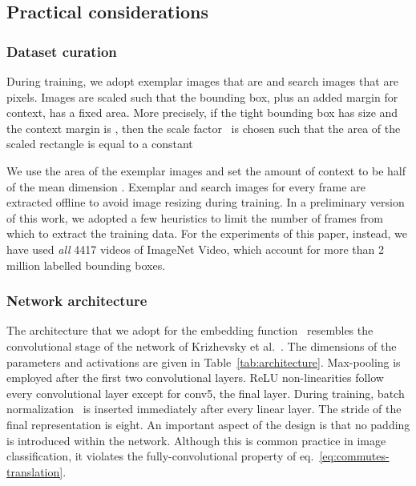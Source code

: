 \documentclass[runningheads]{llncs}
\begin{document}
\subsection{Practical considerations}
\label{sec:considerations}



\subsubsection{Dataset curation}
During training, we adopt exemplar images that are  and search images that are  pixels.
Images are scaled such that the bounding box, plus an added margin for context, has a fixed area.
More precisely, if the tight bounding box has size  and the context margin is , then the scale factor~ is chosen such that the area of the scaled rectangle is equal to a constant

We use the area of the exemplar images  and set the amount of context to be half of the mean dimension .
Exemplar and search images for every frame are extracted offline to avoid image resizing during training.
In a preliminary version of this work, we adopted a few heuristics to limit the number of frames from which to extract the training data.
For the experiments of this paper, instead, we have used \emph{all} 4417 videos of ImageNet Video, which account for more than 2 million labelled bounding boxes.

\subsubsection{Network architecture}
The architecture that we adopt for the embedding function~ resembles the convolutional stage of the network of Krizhevsky et al.~\cite{krizhevsky2012imagenet}.
The dimensions of the parameters and activations are given in Table~\ref{tab:architecture}.
Max-pooling is employed after the first two convolutional layers.
ReLU non-linearities follow every convolutional layer except for conv5, the final layer.
During training, batch normalization~\cite{ioffe2015batch} is inserted immediately after every linear layer.
The stride of the final representation is eight.
An important aspect of the design is that no padding is introduced within the network.
Although this is common practice in image classification, it violates the fully-convolutional property of eq.~\ref{eq:commutes-translation}.
\end{document}
